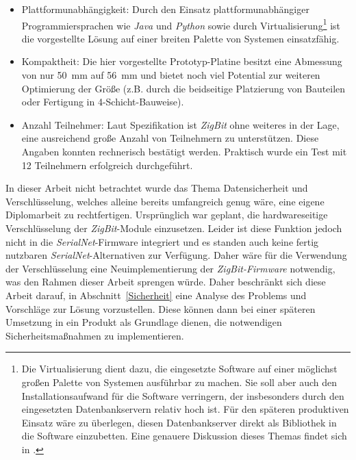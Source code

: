 \begin{itemize}
    \item{Plattformunabhängigkeit:} Durch den Einsatz plattformunabhängiger Programmiersprachen wie \emph{Java}
          und \emph{Python} sowie durch Virtualisierung\footnote{Die Virtualisierung dient dazu, die
              eingesetzte Software auf einer möglichst großen Palette von Systemen ausführbar zu machen. Sie
              soll aber auch den Installationsaufwand für die Software verringern, der insbesonders durch den
              eingesetzten Datenbankservern relativ hoch ist. Für den späteren produktiven Einsatz wäre zu
              überlegen, diesen Datenbankserver direkt als Bibliothek in die Software einzubetten. Eine
              genauere Diskussion dieses Themas findet sich in \cite{Jan}.} ist die vorgestellte Lösung auf
          einer breiten Palette von Systemen einsatzfähig.

    \item{Kompaktheit:} Die hier vorgestellte Prototyp-Platine besitzt eine Abmessung von nur
          50~mm auf 56~mm und bietet noch viel Potential zur weiteren Optimierung der Größe (z.B. durch
          die beidseitige Platzierung von Bauteilen oder Fertigung in 4-Schicht-Bauweise).

    \item{Anzahl Teilnehmer:} Laut Spezifikation ist \emph{ZigBit} ohne weiteres in der Lage, eine ausreichend
                              große Anzahl von Teilnehmern zu unterstützen. Diese Angaben konnten rechnerisch
                              bestätigt werden. Praktisch wurde ein Test mit 12 Teilnehmern erfolgreich durchgeführt.
\end{itemize}

In dieser Arbeit nicht betrachtet wurde das Thema Datensicherheit und Verschlüsselung, welches alleine bereits
umfangreich genug wäre, eine eigene Diplomarbeit zu rechtfertigen. Ursprünglich war geplant, die hardwareseitige
Verschlüsselung der \emph{ZigBit}-Module einzusetzen. Leider ist diese Funktion jedoch nicht in die 
\emph{SerialNet}-Firmware integriert und es standen auch keine fertig nutzbaren \emph{SerialNet}-Alternativen zur Verfügung. 
Daher wäre für die Verwendung der Verschlüsselung eine Neuimplementierung der
\emph{ZigBit-Firmware} notwendig, was den Rahmen dieser Arbeit sprengen würde. Daher beschränkt 
sich diese Arbeit darauf, in Abschnitt~\ref{Sicherheit} eine Analyse des Problems und 
Vorschläge zur Lösung vorzustellen. Diese können dann bei einer späteren Umsetzung in ein Produkt als Grundlage
dienen, die notwendigen Sicherheitsmaßnahmen zu implementieren.
